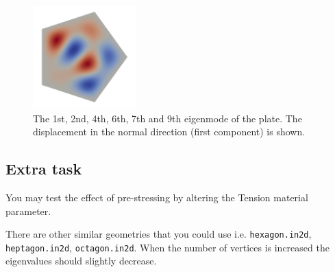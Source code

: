 \begin{figure}
\begin{center}
\includegraphics[width=40mm]{mode9}
\caption{The 1st, 2nd, 4th, 6th, 7th and 9th eigenmode of the plate. The displacement in the normal direction (first component) is shown.}
\label{fg:pentagonpost}
\end{center}
\end{figure}

\subsection*{Extra task}
You may test the effect of pre-stressing by altering the Tension material parameter.  

There are other similar geometries that you could use i.e. \texttt{hexagon.in2d}, \texttt{heptagon.in2d}, 
\texttt{octagon.in2d}.
When the number of vertices is increased the eigenvalues should slightly decrease. 



\hfill
\mbox{}






